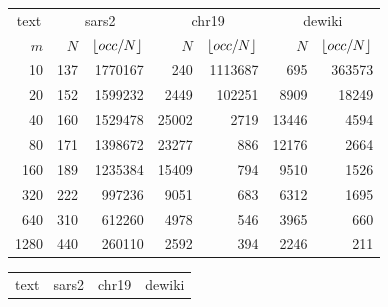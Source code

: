 \begin{table}[p]
\begin{minipage}[c]{0.49\textwidth}
\vspace{0.5cm}
\begin{tabular}{|r|rr|rr|rr|}
\hline
\multicolumn{1}{|c|}{text}
& \multicolumn{2}{c|}{sars2}
& \multicolumn{2}{c|}{chr19}
& \multicolumn{2}{c|}{dewiki} \\
$m$
& $N$ & $\lfloor occ/N \rfloor$
& $N$ & $\lfloor occ/N \rfloor$
& $N$ & $\lfloor occ/N \rfloor$ \\
\hline
  10 & 137 & 1770167 &   240 & 1113687 &   695 & 363573 \\
  20 & 152 & 1599232 &  2449 &  102251 &  8909 &  18249 \\
  40 & 160 & 1529478 & 25002 &    2719 & 13446 &   4594 \\
  80 & 171 & 1398672 & 23277 &     886 & 12176 &   2664 \\
 160 & 189 & 1235384 & 15409 &     794 &  9510 &   1526 \\
 320 & 222 &  997236 &  9051 &     683 &  6312 &   1695 \\
 640 & 310 &  612260 &  4978 &     546 &  3965 &    660 \\
1280 & 440 &  260110 &  2592 &     394 &  2246 &    211 \\
\hline
\end{tabular}
\label{tab:patterns_locate}
\end{minipage}
\hfill
\begin{minipage}[c]{0.49\textwidth}
\centering
\fontsize{6.5pt}{7.6pt}\selectfont
\setlength{\tabcolsep}{2pt}
\renewcommand{\arraystretch}{1.18}
\begin{tabular}{|rr|rr|rr|rr|}
\hline
\multicolumn{2}{|c|}{text}
& \multicolumn{2}{c|}{sars2}
& \multicolumn{2}{c|}{chr19}
& \multicolumn{2}{c|}{dewiki} \\

\end{tabular}
\end{minipage}
\end{table}
